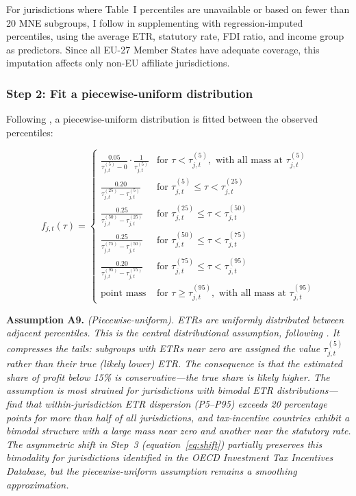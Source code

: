 \documentclass[11pt,a4paper]{article}
\newcommand{\assumption}[2]{\noindent\textbf{Assumption #1.} \textit{#2}\medskip}
\begin{document}
For jurisdictions where Table~I percentiles are unavailable or based on fewer than 20 MNE subgroups, I follow \citet{hugger2025} in supplementing with regression-imputed percentiles, using the average ETR, statutory rate, FDI ratio, and income group as predictors. Since all EU-27 Member States have adequate coverage, this imputation affects only non-EU affiliate jurisdictions.

\subsubsection{Step 2: Fit a piecewise-uniform distribution}

Following \citet{hugger2025}, a piecewise-uniform distribution is fitted between the observed percentiles:

\begin{equation}\label{eq:piecewise}
f_{j,t}(\tau) = \begin{cases}
\frac{0.05}{\tau_{j,t}^{(5)} - 0} \cdot \frac{1}{\tau_{j,t}^{(5)}} & \text{for } \tau < \tau_{j,t}^{(5)}, \text{ with all mass at } \tau_{j,t}^{(5)} \\[6pt]
\frac{0.20}{\tau_{j,t}^{(25)} - \tau_{j,t}^{(5)}} & \text{for } \tau_{j,t}^{(5)} \leq \tau < \tau_{j,t}^{(25)} \\[6pt]
\frac{0.25}{\tau_{j,t}^{(50)} - \tau_{j,t}^{(25)}} & \text{for } \tau_{j,t}^{(25)} \leq \tau < \tau_{j,t}^{(50)} \\[6pt]
\frac{0.25}{\tau_{j,t}^{(75)} - \tau_{j,t}^{(50)}} & \text{for } \tau_{j,t}^{(50)} \leq \tau < \tau_{j,t}^{(75)} \\[6pt]
\frac{0.20}{\tau_{j,t}^{(95)} - \tau_{j,t}^{(75)}} & \text{for } \tau_{j,t}^{(75)} \leq \tau < \tau_{j,t}^{(95)} \\[6pt]
\text{point mass} & \text{for } \tau \geq \tau_{j,t}^{(95)}, \text{ with all mass at } \tau_{j,t}^{(95)}
\end{cases}
\end{equation}

\assumption{A9}{(Piecewise-uniform). ETRs are uniformly distributed between adjacent percentiles. This is the central distributional assumption, following \citet{hugger2025}. It compresses the tails: subgroups with ETRs near zero are assigned the value $\tau_{j,t}^{(5)}$ rather than their true (likely lower) ETR. The consequence is that the estimated share of profit below 15\% is \emph{conservative}---the true share is likely higher. The assumption is most strained for jurisdictions with bimodal ETR distributions---\citet{hugger2025} find that within-jurisdiction ETR dispersion (P5--P95) exceeds 20 percentage points for more than half of all jurisdictions, and tax-incentive countries exhibit a bimodal structure with a large mass near zero and another near the statutory rate. The asymmetric shift in Step~3 (equation~\ref{eq:shift}) partially preserves this bimodality for jurisdictions identified in the OECD Investment Tax Incentives Database, but the piecewise-uniform assumption remains a smoothing approximation.}
\end{document}
